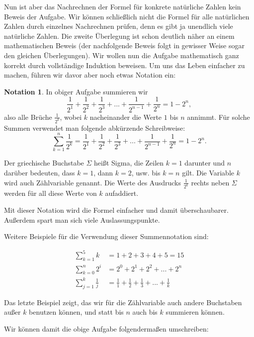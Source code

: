 \documentclass[a4paper,ngerman,12pt]{scrartcl}
\theoremstyle{definition}
\newtheorem*{nota}{Notation}
\begin{document}
Nun ist aber das Nachrechnen der Formel für konkrete natürliche Zahlen kein Beweis der Aufgabe. Wir können schließlich nicht die Formel für alle natürlichen Zahlen durch einzelnes Nachrechnen prüfen, denn es gibt ja unendlich viele natürliche Zahlen. Die zweite Überlegung ist schon deutlich näher an einem mathematischen Beweis (der nachfolgende Beweis folgt in gewisser Weise sogar den gleichen Überlegungen). Wir wollen nun die Aufgabe mathematisch ganz korrekt durch vollständige Induktion beweisen. Um uns das Leben einfacher zu machen, führen wir davor aber noch etwas Notation ein:

\begin{shaded}
  \begin{nota}
    In obiger Aufgabe summieren wir
    \[ \frac{1}{2^1} + \frac{1}{2^2} + \frac{1}{2^3} + ... + \frac{1}{2^{n-1}} + \frac{1}{2^n} = 1 - 2^n, \]
    also alle Brüche $\frac{1}{2^k}$, wobei $k$ nacheinander die Werte $1$ bis $n$ annimmt. Für solche Summen verwendet man folgende abkürzende Schreibweise:
    \[ \sum_{k=1}^n \frac{1}{2^k} = \frac{1}{2^1} + \frac{1}{2^2} + \frac{1}{2^3} + ... + \frac{1}{2^{n-1}} + \frac{1}{2^n} = 1 - 2^n. \]

    Der griechische Buchstabe $\Sigma$ heißt Sigma, die Zeilen $k=1$ darunter und $n$ darüber bedeuten, dass $k=1$, dann $k=2$, usw. bis $k=n$ gilt. Die Variable $k$ wird auch Zählvariable genannt. Die Werte des Ausdrucks $\frac{1}{2^k}$ rechts neben $\Sigma$ werden für all diese Werte von $k$ aufaddiert.

    Mit dieser Notation wird die Formel einfacher und damit überschaubarer. Außerdem spart man sich viele Auslassungspunkte.

    Weitere Beispiele für die Verwendung dieser Summennotation sind:

    \begin{align*}
      \sum_{k=1}^5 k &= 1 + 2 + 3 + 4 + 5 = 15 \\
      \sum_{k=0}^n 2^i &= 2^0 + 2^1 + 2^2 + ... + 2^n \\
      \sum_{j=1}^k \frac{1}{j} &= \frac{1}{1} + \frac{1}{2} + \frac{1}{3} + ... + \frac{1}{k}
    \end{align*}

    Das letzte Beispiel zeigt, das wir für die Zählvariable auch andere Buchstaben außer $k$ benutzen können, und statt bis $n$ auch bis $k$ summieren können.
  \end{nota}
\end{shaded}

Wir können damit die obige Aufgabe folgendermaßen umschreiben:
\end{document}
